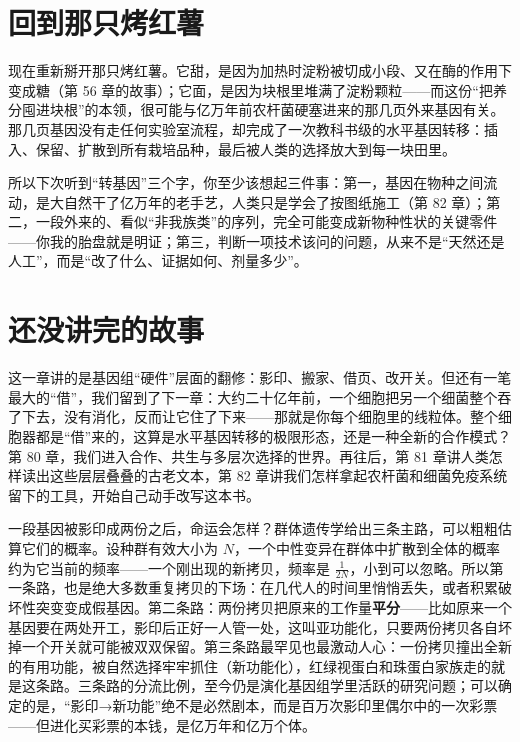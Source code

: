 \section{回到那只烤红薯}

现在重新掰开那只烤红薯。它甜，是因为加热时淀粉被切成小段、又在酶的作用下变成糖（第 56 章的故事）；它面，是因为块根里堆满了淀粉颗粒——而这份“把养分囤进块根”的本领，很可能与亿万年前农杆菌硬塞进来的那几页外来基因有关。那几页基因没有走任何实验室流程，却完成了一次教科书级的水平基因转移：插入、保留、扩散到所有栽培品种，最后被人类的选择放大到每一块田里。

所以下次听到“转基因”三个字，你至少该想起三件事：第一，基因在物种之间流动，是大自然干了亿万年的老手艺，人类只是学会了按图纸施工（第 82 章）；第二，一段外来的、看似“非我族类”的序列，完全可能变成新物种性状的关键零件——你我的胎盘就是明证；第三，判断一项技术该问的问题，从来不是“天然还是人工”，而是“改了什么、证据如何、剂量多少”。

\section{还没讲完的故事}

这一章讲的是基因组“硬件”层面的翻修：影印、搬家、借页、改开关。但还有一笔最大的“借”，我们留到了下一章：大约二十亿年前，一个细胞把另一个细菌整个吞了下去，没有消化，反而让它住了下来——那就是你每个细胞里的线粒体。整个细胞器都是“借”来的，这算是水平基因转移的极限形态，还是一种全新的合作模式？第 80 章，我们进入合作、共生与多层次选择的世界。再往后，第 81 章讲人类怎样读出这些层层叠叠的古老文本，第 82 章讲我们怎样拿起农杆菌和细菌免疫系统留下的工具，开始自己动手改写这本书。

\begin{tiaozhan}
一段基因被影印成两份之后，命运会怎样？群体遗传学给出三条主路，可以粗粗估算它们的概率。设种群有效大小为 $N$，一个中性变异在群体中扩散到全体的概率约为它当前的频率——一个刚出现的新拷贝，频率是 $\frac{1}{2N}$，小到可以忽略。所以第一条路，也是绝大多数重复拷贝的下场：在几代人的时间里悄悄丢失，或者积累破坏性突变变成假基因。第二条路：两份拷贝把原来的工作量\textbf{平分}——比如原来一个基因要在两处开工，影印后正好一人管一处，这叫亚功能化，只要两份拷贝各自坏掉一个开关就可能被双双保留。第三条路最罕见也最激动人心：一份拷贝撞出全新的有用功能，被自然选择牢牢抓住（新功能化），红绿视蛋白和珠蛋白家族走的就是这条路。三条路的分流比例，至今仍是演化基因组学里活跃的研究问题；可以确定的是，“影印→新功能”绝不是必然剧本，而是百万次影印里偶尔中的一次彩票——但进化买彩票的本钱，是亿万年和亿万个体。
\end{tiaozhan}

